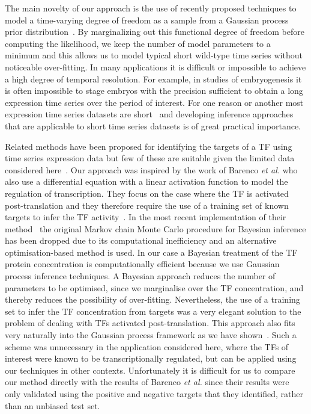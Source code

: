 \documentclass{pnastwo}
\begin{document}
\begin{article}
The main novelty of our approach is the use of recently proposed
techniques to model a time-varying degree of freedom as a sample from
a Gaussian process prior distribution~\cite{Gao2008}. By marginalizing out this functional
degree of freedom before computing the likelihood, we keep the
number of model parameters to a minimum and this allows us to model
typical short wild-type time series without noticeable over-fitting. In
many applications it is difficult or impossible to achieve a high
degree of temporal resolution. For example, in studies of
embryogenesis it is often impossible to stage embryos with the
precision sufficient to obtain a long expression time series over the
period of interest. For one reason or another most expression time
series datasets are short~\cite{Ernst2005} and developing inference approaches
that are applicable to short time series datasets is of great
practical importance.  

Related methods have been proposed for identifying the
targets of a TF using time series expression data but few of these are suitable given the
limited data considered here~\cite{Bansal2007a}. Our approach was inspired by the work of Barenco {\em et
al.} who also use a differential equation with a linear activation
function to model the regulation of transcription. They focus on the
case where the TF is activated post-translation and they therefore
require the use of a training set of
known targets to infer the TF activity~\cite{Barenco2006a}. In the most recent
implementation of their method~\cite{Barenco2009} the original Markov
chain Monte Carlo procedure for Bayesian inference has been dropped due to its computational
inefficiency and an alternative optimisation-based method is used. In our case a Bayesian treatment of the TF protein
concentration is computationally efficient because we use Gaussian
process inference techniques. A Bayesian approach reduces the number of parameters
to be optimised, since we marginalise over the TF concentration, and
thereby reduces the possibility of over-fitting. Nevertheless, the use of a training set to infer the
TF concentration from targets was a very elegant solution to the
problem of dealing with TFs activated post-translation. This
approach also fits very naturally into the Gaussian process
framework as we have shown~\cite{Gao2008}. Such a scheme was unnecessary in the application considered
here, where the TFs of interest were known to be transcriptionally
regulated, but can be applied using our techniques in other
contexts. Unfortunately it is difficult for us to compare our method
directly with the results of Barenco {\em et al.} since their results
were only validated using the positive and negative targets that they identified,
rather than an unbiased test set. 


\end{article}
\end{document}
